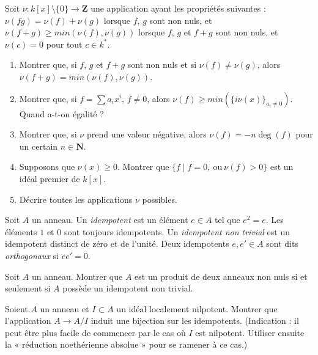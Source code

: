 \begin{exercise}
\label{exercise-valuation}
Soit $\nu : k[x]\setminus \{0\}  \to {\mathbf Z}$ une application
ayant les propriétés suivantes : $\nu(fg) = \nu(f) + \nu(g)$ lorsque
$f$, $g$ sont non nuls, et $\nu(f + g) \geq min(\nu(f), \nu(g))$ lorsque
$f$, $g$ et $f + g$ sont non nuls, et $\nu(c) = 0$ pour tout $c\in k^*$.
\begin{enumerate}
\item Montrer que, si $f$, $g$ et $f + g$ sont non nuls et si
$\nu(f) \not = \nu(g)$, alors $\nu(f + g) = min(\nu(f), \nu(g))$.
\item Montrer que, si $f = \sum a_i x^i$, $f\not = 0$, alors
$\nu(f) \geq min(\{i\nu(x)\}_{a_i\not = 0})$. Quand a-t-on égalité ?
\item Montrer que, si $\nu$ prend une valeur négative, alors
$\nu(f) = -n \deg(f)$ pour un certain $n\in {\mathbf N}$.
\item Supposons que $\nu(x) \geq 0$. Montrer que
$\{f \mid f = 0, \ \text{ou}\ \nu(f) > 0\}$ est un idéal premier de $k[x]$.
\item Décrire toutes les applications $\nu$ possibles.
\end{enumerate}
\end{exercise}


\noindent
Soit $A$ un anneau. Un {\it idempotent} est un élément $e \in A$
tel que $e^2 = e$. Les éléments $1$ et $0$ sont toujours idempotents.
Un {\it idempotent non trivial} est un idempotent distinct de zéro et de l'unité.
Deux idempotents $e, e' \in A$ sont dits {\it orthogonaux}
si $ee' = 0$.

\begin{exercise}
\label{exercise-product}
Soit $A$ un anneau. Montrer que $A$ est un produit de deux anneaux non nuls si
et seulement si $A$ possède un idempotent non trivial.
\end{exercise}

\begin{exercise}
\label{exercise-lift-idempotents}
Soient $A$ un anneau et $I \subset A$ un idéal localement nilpotent.
Montrer que l'application $A \to A/I$ induit une bijection sur les idempotents.
(Indication : il peut être plus facile de commencer par le cas où $I$ est nilpotent.
Utiliser ensuite la « réduction noethérienne absolue » pour se ramener à ce cas.)
\end{exercise}







